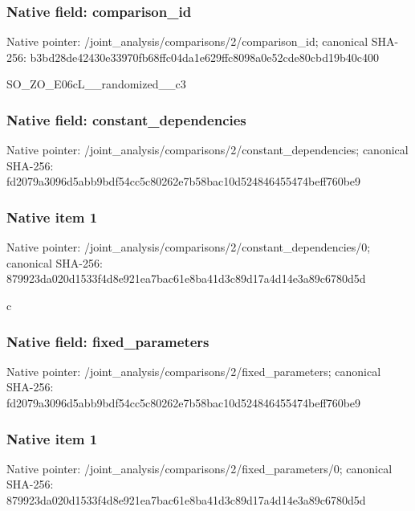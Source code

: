 \documentclass[10pt,a4paper]{article}
\begin{document}
\subsubsection{Native field: comparison\_id}


Native pointer: /joint\_analysis/comparis\allowbreak{}ons/2/comparison\_id; canonical SHA-256: b3bd28de42430e33970fb68f\allowbreak{}fc04da1e629ffc8098a0e52c\allowbreak{}de80cbd19b40c400


SO\_ZO\_E06cL\_\_randomized\_\_c3


\subsubsection{Native field: constant\_dependencies}


Native pointer: /joint\_analysis/comparis\allowbreak{}ons/2/constant\_dependenc\allowbreak{}ies; canonical SHA-256: fd2079a3096d5abb9bdf54cc\allowbreak{}5c80262e7b58bac10d524846\allowbreak{}455474beff760be9



\subsubsection{Native item 1}


Native pointer: /joint\_analysis/comparis\allowbreak{}ons/2/constant\_dependenc\allowbreak{}ies/0; canonical SHA-256: 879923da020d1533f4d8e921\allowbreak{}ea7bac61e8ba41d3c89d17a4\allowbreak{}d14e3a89c6780d5d


c


\subsubsection{Native field: fixed\_parameters}


Native pointer: /joint\_analysis/comparis\allowbreak{}ons/2/fixed\_parameters; canonical SHA-256: fd2079a3096d5abb9bdf54cc\allowbreak{}5c80262e7b58bac10d524846\allowbreak{}455474beff760be9



\subsubsection{Native item 1}


Native pointer: /joint\_analysis/comparis\allowbreak{}ons/2/fixed\_parameters/0; canonical SHA-256: 879923da020d1533f4d8e921\allowbreak{}ea7bac61e8ba41d3c89d17a4\allowbreak{}d14e3a89c6780d5d
\end{document}
